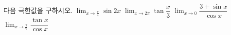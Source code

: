 다음 극한값을 구하시오.
 $\displaystyle\lim_{x\to\frac{\pi}{4}}\sin 2x$
 $\displaystyle\lim_{x\to 2\pi}\tan\dfrac{x}{3}$
 $\displaystyle\lim_{x\to 0}\dfrac{3+\sin x}{\cos x}$
 $\displaystyle\lim_{x\to\frac{\pi}{6}}\dfrac{\tan x}{\cos x}$
